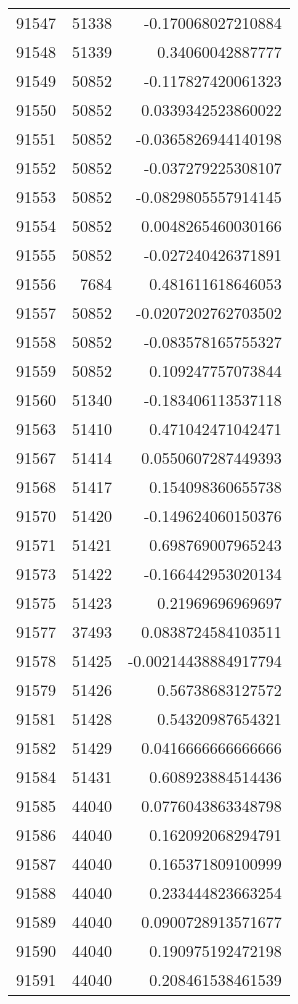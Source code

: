 \begin{tabular}{r | r | r}
91547 & 51338 & -0.170068027210884 \\
91548 & 51339 & 0.34060042887777 \\
91549 & 50852 & -0.117827420061323 \\
91550 & 50852 & 0.0339342523860022 \\
91551 & 50852 & -0.0365826944140198 \\
91552 & 50852 & -0.037279225308107 \\
91553 & 50852 & -0.0829805557914145 \\
91554 & 50852 & 0.0048265460030166 \\
91555 & 50852 & -0.027240426371891 \\
91556 & 7684 & 0.481611618646053 \\
91557 & 50852 & -0.0207202762703502 \\
91558 & 50852 & -0.083578165755327 \\
91559 & 50852 & 0.109247757073844 \\
91560 & 51340 & -0.183406113537118 \\
91563 & 51410 & 0.471042471042471 \\
91567 & 51414 & 0.0550607287449393 \\
91568 & 51417 & 0.154098360655738 \\
91570 & 51420 & -0.149624060150376 \\
91571 & 51421 & 0.698769007965243 \\
91573 & 51422 & -0.166442953020134 \\
91575 & 51423 & 0.21969696969697 \\
91577 & 37493 & 0.0838724584103511 \\
91578 & 51425 & -0.00214438884917794 \\
91579 & 51426 & 0.56738683127572 \\
91581 & 51428 & 0.54320987654321 \\
91582 & 51429 & 0.0416666666666666 \\
91584 & 51431 & 0.608923884514436 \\
91585 & 44040 & 0.0776043863348798 \\
91586 & 44040 & 0.162092068294791 \\
91587 & 44040 & 0.165371809100999 \\
91588 & 44040 & 0.233444823663254 \\
91589 & 44040 & 0.0900728913571677 \\
91590 & 44040 & 0.190975192472198 \\
91591 & 44040 & 0.208461538461539 \\

\end{tabular}
